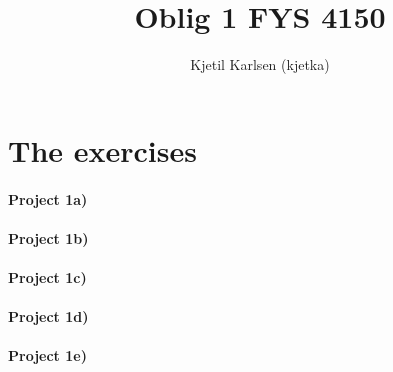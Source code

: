 


\title{Oblig 1 FYS 4150}
\author{Kjetil Karlsen (kjetka)}




\maketitle

\section{The exercises}
\paragraph{Project 1a)}


\paragraph{Project 1b)}

\paragraph{Project 1c)}

\paragraph{Project 1d)}

\paragraph{Project 1e)}



